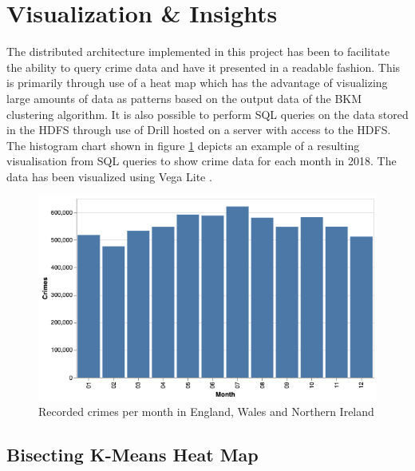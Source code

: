 \documentclass[main.tex]{subfiles}
\begin{document}
\section{Visualization \& Insights}
The distributed architecture implemented in this project has been to facilitate the ability to query crime data and have it presented in a readable fashion. This is primarily through use of a heat map which has the advantage of visualizing large amounts of data as patterns based on the output data of the BKM clustering algorithm. It is also possible to perform SQL queries on the data stored in the HDFS through use of Drill hosted on a server with access to the HDFS. The histogram chart shown in figure \ref{fig:crimeMonths} depicts an example of a resulting visualisation from SQL queries to show crime data for each month in 2018. The data has been visualized using Vega Lite \cite{VegaLite}. 

\begin{figure}[H]
    \centering
    \includegraphics{Images/CrimeMonths.png}
    \caption{Recorded crimes per month in England, Wales and Northern Ireland}
    \label{fig:crimeMonths}
\end{figure}

\subsection{Bisecting K-Means Heat Map}
\end{document}
